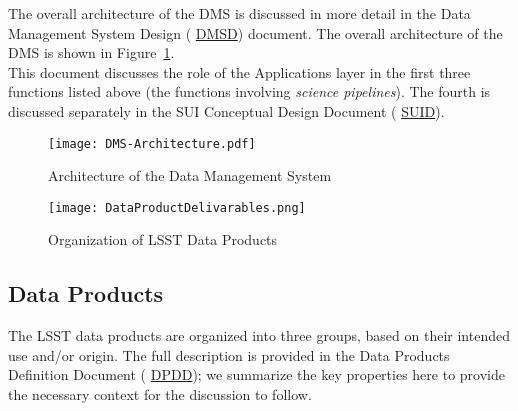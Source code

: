 \documentclass[12pt]{article}
\newcommand{\ds}[2]{{\color{blue} \href{https://docushare.lsstcorp.org/docushare/dsweb/Get/#1}{#2}}\xspace}
\newcommand{\DPDD}{\ds{LSE-163}{DPDD}}
\newcommand{\SUI}{\ds{LDM-131}{SUID}}
\newcommand{\DMSD}{\ds{LDM-148}{DMSD}}
\begin{document}
The overall architecture of the DMS is discussed in more detail in the Data Management System Design (\DMSD) document. The overall architecture of the DMS is shown in Figure~\ref{fig:DMS}.
\\

This document discusses the role of the Applications layer in the first three functions listed above (the functions involving \emph{science pipelines}).  The fourth is discussed separately in the SUI Conceptual Design Document (\SUI).

\begin{figure}
\centering
\texttt{[image: DMS-Architecture.pdf]}
\caption{Architecture of the Data Management System\label{fig:DMS}}
\end{figure}

\begin{figure}
\centering
\texttt{[image: DataProductDelivarables.png]}
\caption{Organization of LSST Data Products\label{fig:DP}}
\end{figure}

\subsection{Data Products}

The LSST data products are organized into three groups, based on their intended use and/or origin. The full description is provided in the Data Products Definition Document (\DPDD); we summarize the key properties here to provide the necessary context for the discussion to follow. 
\end{document}
